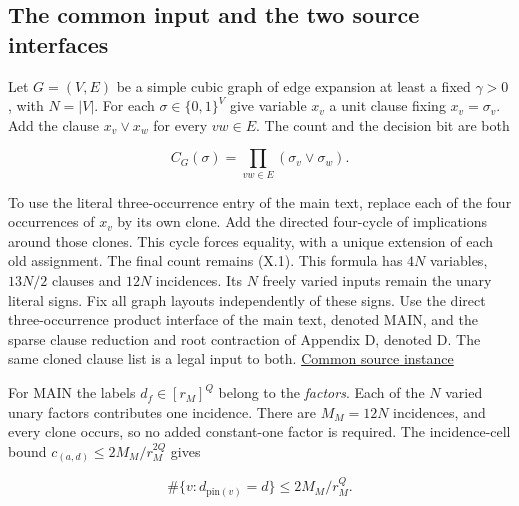 \documentclass[
  11pt,
]{article}
\begin{document}
\subsection{The common input and the two source
interfaces}\label{the-common-input-and-the-two-source-interfaces}

Let \(G=(V,E)\) be a simple cubic graph of edge expansion at least a
fixed \(\gamma>0\), with \(N=|V|\). For each \(\sigma\in\{0,1\}^V\) give
variable \(x_v\) a unit clause fixing \(x_v=\sigma_v\). Add the clause
\(x_v\lor x_w\) for every \(vw\in E\). The count and the decision bit
are both

\[
 C_G(\sigma)=\prod_{vw\in E}(\sigma_v\lor\sigma_w).
 \tag{X.1}
\]

To use the literal three-occurrence entry of the main text, replace each
of the four occurrences of \(x_v\) by its own clone. Add the directed
four-cycle of implications around those clones. This cycle forces
equality, with a unique extension of each old assignment. The final
count remains (X.1). This formula has \(4N\) variables, \(13N/2\)
clauses and \(12N\) incidences. Its \(N\) freely varied inputs remain
the unary literal signs. Fix all graph layouts independently of these
signs. Use the direct three-occurrence product interface of the main
text, denoted MAIN, and the sparse clause reduction and root contraction
of Appendix D, denoted D. The same cloned clause list is a legal input
to both. \href{https://github.com/dch-and-Elara/some-research-inspired-by-openais-eth-preprint/tree/main/rank-budget-barriers}{Common source instance}

For MAIN the labels \(d_f\in[r_M]^Q\) belong to the \emph{factors}. Each
of the \(N\) varied unary factors contributes one incidence. There are
\(M_M=12N\) incidences, and every clone occurs, so no added constant-one
factor is required. The incidence-cell bound
\(c_{(a,d)}\le 2M_M/r_M^{2Q}\) gives

\[
 \#\{v:d_{\mathrm{pin}(v)}=d\}\le 2M_M/r_M^Q .
\]
\end{document}
